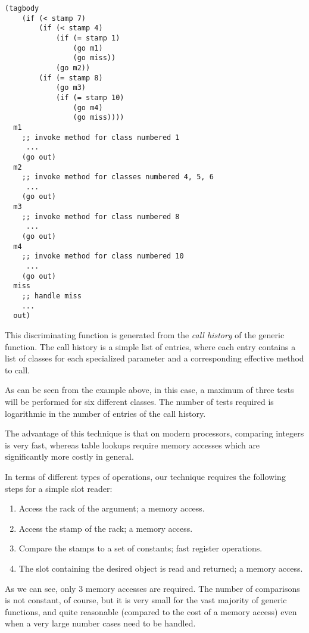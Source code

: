 \begin{verbatim}
(tagbody 
    (if (< stamp 7)
        (if (< stamp 4)
            (if (= stamp 1)
                (go m1)
                (go miss))
            (go m2))
        (if (= stamp 8)
            (go m3)
            (if (= stamp 10)
                (go m4)
                (go miss))))
  m1
    ;; invoke method for class numbered 1
     ...
    (go out)
  m2
    ;; invoke method for classes numbered 4, 5, 6
     ...
    (go out)
  m3
    ;; invoke method for class numbered 8
     ...
    (go out)   
  m4
    ;; invoke method for class numbered 10
     ...
    (go out)   
  miss
    ;; handle miss
    ...
  out)
\end{verbatim}

This discriminating function is generated from the \emph{call history}
of the generic function.  The call history is a simple list of
entries, where each entry contains a list of classes for each
specialized parameter and a corresponding effective method to call. 

As can be seen from the example above, in this case, a maximum of
three tests will be performed for six different classes.  The number
of tests required is logarithmic in the number of entries of the call
history.

The advantage of this technique is that on modern processors,
comparing integers is very fast, whereas table lookups require memory
accesses which are significantly more costly in general.

In terms of different types of operations, our technique
requires the following steps for a simple slot reader:

\begin{enumerate}
\item Access the rack of the argument; a memory access.
\item Access the stamp of the rack; a memory access.
\item Compare the stamps to a set of constants; fast register
  operations.
\item The slot containing the desired object is read and returned; a
  memory access.
\end{enumerate}

As we can see, only 3 memory accesses are required.  The number of
comparisons is not constant, of course, but it is very small for the
vast majority of generic functions, and quite reasonable (compared to
the cost of a memory access) even when a very large number cases need
to be handled. 

